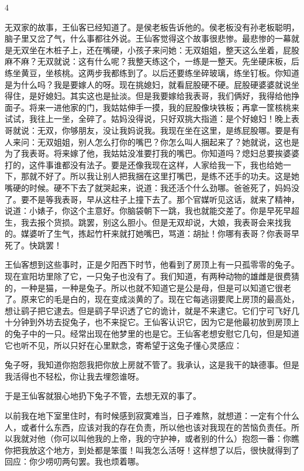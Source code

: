 4 

无双家的故事，王仙客已经知道了。是侯老板告诉他的。侯老板没有孙老板聪明，脑子里又岔了气，什么事都往外说。王仙客觉得这个故事很悲惨。最悲惨的一幕就是无双坐在木桩子上，还在嘴硬，小孩子来问她：无双姐姐，整天这么坐着，屁股麻不麻？无双就说：这有什么呢？我整天练这个，一练是一整天。先坐硬床板，后练坐黄豆，坐核桃。这两步我都练到了。以后还要练坐碎玻璃，练坐钉板。你知道是为什么吗？我是要嫁人的呀。现在挑媳妇，就看屁股硬不硬。屁股硬婆婆就说坐得住，是好媳妇。其实这也是扯淡。但是我要嫁给我表哥，我们俩好，我得给他挣面子。将来一进他家的门，我姑姑伸手一摸，我的屁股像块铁板；再拿一筐核桃来试试，我往上一坐，全碎了。姑妈没得说，只好双挑大指道：是个好媳妇！晚上表哥就说：无双，你够朋友，没让我妈说我。我现在坐在这里，是练屁股哪。要是有人来问：无双姐姐，别人怎么打你的嘴巴？你怎么叫人捆起来了？她就说，这也是为了我表哥。将来嫁了他，我姑姑没准要打我的嘴巴。你知道吗？熄妇总要挨婆婆打的，这件事谁都没有法子。要是还像我现在这样，人家给我一下，我也给她一下，那就不好了。所以我让别人把我捆在这里打嘴巴，是练不还手的功夫。这是她嘴硬的时候。硬不下去了就哭起来，说道：我还活个什么劲哪。爸爸死了，妈妈没了。要不是等我表哥，早从这柱子上撞下去了。那个官媒听见这话，就来了精神，说道：小婊子，你这个主意好。你脑袋朝下一跳，我也就能交差了。你是早死早超生，我去报个货损。跳罢，别这么胆小。但是无双却说，大娘，我表哥会来找我的。媒婆听了生气，拣起竹杆来就打她嘴巴，骂道：胡扯！你哪有表哥？你表哥早死了。快跳罢！ 

王仙客想到这些事时，正是夕阳西下时节，他看到了房顶上有一只孤零零的兔子。现在宣阳坊里除了它，一只兔子也没有了。我们知道，有两种动物的雄雌是很费猜的，一种是猫，一种是兔子。所以也就不知道它是公是母，但是可以知道它很老了。原来它的毛是白的，现在变成淡黄的了。现在它每逃诩要爬上房顶的最高处，想让鹞子把它逮去。但是鹞子早识透了它的诡计，就是不来逮它。它们宁可飞好几十分钟到外坊去捉兔子，也不来捉它。王仙客认识它，因为它是他最初放到房顶上的兔子中的一只。经常出现在他梦里的也是它。王仙客老想安慰它几句，但是知道它也听不见，所以只好在心里默念，寄希望于这兔子懂心灵感应： 

兔子呀，我知道你抱怨我把你放上房就不管了。我承认，这是我干的缺德事。但是我活得也不轻松，你让我去埋怨谁呀。 

于是王仙客就狠心地扔下兔子不管，去想无双的事了。 

以前我在地下室里住时，有时候感到寂寞难当，日子难熬，就想道：一定有个什么人，或者什么东西，应该对我的存在负责，所以他也该对我现在的苦恼负责任。所以我就对他（你可以叫他我的上帝，我的守护神，或者别的什么）抱怨一番：你瞧你把我放这个地方，到处都是笨蛋！叫我怎么活呀！这样想了以后，很快就得到了回应：你少唠叨两句罢。我也烦着哪。 

